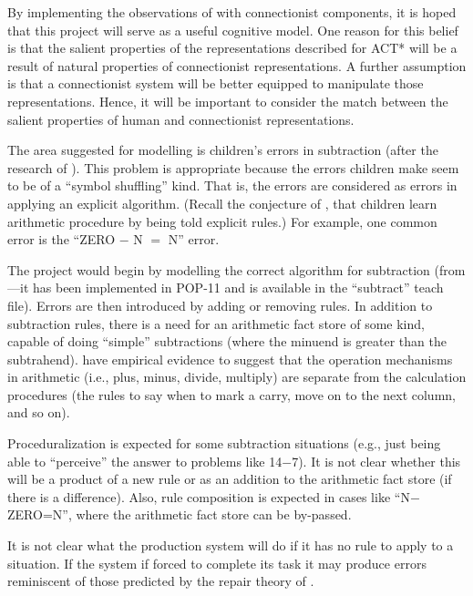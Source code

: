 
\label{model}

By implementing the observations of  with connectionist
components, it is hoped that this project will serve as a useful
cognitive model.  One reason for this belief is that the salient
properties of the representations described for ACT* will be a result
of natural properties of connectionist representations.  A further
assumption is that a connectionist system will be better equipped to
manipulate those representations. Hence, it will be important to
consider the match between the salient properties of  human and
connectionist representations.

The area suggested for modelling is children's errors in subtraction
(after the research of ).  This problem is appropriate
because the errors children make seem to be of a ``symbol shuffling''
kind.  That is, the errors are considered as errors in applying an
explicit algorithm. (Recall the conjecture of , that
children learn arithmetic procedure by being told explicit rules.)
For example, one common error is the ``ZERO $-$ N $=$ N'' error.

The project would begin by modelling the correct algorithm for
subtraction (from ---it has been implemented in POP-11
and is available in the ``subtract'' teach file).  Errors are then
introduced by adding or removing rules. In addition to subtraction
rules, there is a need for an arithmetic fact store of some kind,
capable of doing ``simple'' subtractions (where the minuend is greater
than the subtrahend).  have empirical evidence to
suggest that the operation mechanisms in arithmetic (i.e., plus,
minus, divide, multiply) are separate from the calculation procedures
(the rules to say when to mark a carry, move on to the next column,
and so on).

Proceduralization is expected for some subtraction situations (e.g.,
just being able to ``perceive'' the answer to problems like 14$-$7).
It is not clear whether this will be a product of a new rule or as an
addition to the arithmetic fact store (if there is a difference).
Also, rule composition is expected in cases like ``N$-$ZERO=N'', where
the arithmetic fact store can be by-passed.

It is not clear what the production system will do if it
has no rule to apply to a situation.  If the system if forced to
complete its task it may produce errors reminiscent of those
predicted by the repair theory of .

